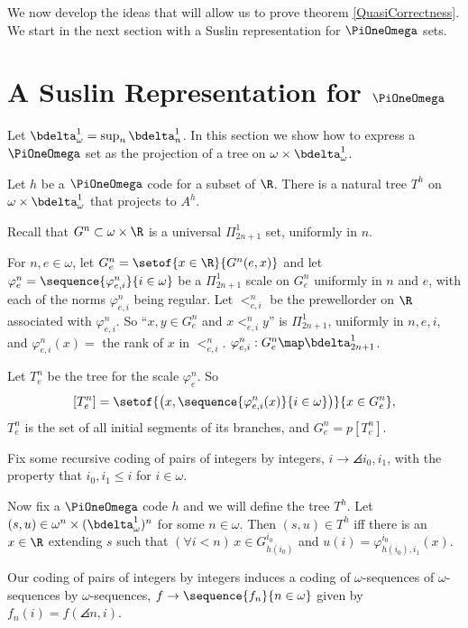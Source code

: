\documentclass[oneside,12pt]{amsart}
\begin{document}
We now develop the ideas that will allow us to prove theorem \ref{QuasiCorrectness}. We
start in the next section with a Suslin representation for $\PiOneOmega$ sets.

\section{A Suslin Representation for $\PiOneOmega$}
\label{section:suslinrep}

Let $\bdelta^1_{\omega} = \sup_n \bdelta^1_n$. In this section we show how to
express a $\PiOneOmega$ set as the projection
of a tree on $\omega\times \bdelta^1_{\omega}$.

\begin{definition}
Let $h$ be a $\PiOneOmega$ code for a subset of $\R$.
There is a natural tree $T^{h}$ on $\omega\times\bdelta^1_{\omega}$ that projects to $A^h$.

Recall that $G^n\subset\omega\times\R$ is a universal $\Pi^1_{2n+1}$ set, uniformly in $n$.

For $n,e\in\omega$, let $G^n_e = \setof{x\in\R}{G^n(e, x)}$ and
let $\varphi^n_e = \sequence{\varphi^n_{e,i}}{i\in\omega}$ be a $\Pi^1_{2n+1}$ scale on $G^n_e$ uniformly in $n$ and $e$,
with each of the norms $\varphi^n_{e,i}$ being regular.
Let $<^n_{e,i}$ be the prewellorder on $\R$ associated with $\varphi^n_{e,i}$. So ``$x,y\in G^n_e$ and $x <^n_{e,i} y$'' is
$\Pi^1_{2n+1}$, uniformly in $n,e,i$, and $\varphi^n_{e,i}(x) = $ the rank of $x$ in $<^n_{e,i}$.
$\varphi^n_{e,i} : G^n_e \map \bdelta^1_{2n+1}$.

Let $T^n_e$ be the tree for the scale $\varphi^n_e$. So
$$[T^n_e] = \setof{\left(x,\sequence{\varphi^n_{e,i}(x)}{i\in\omega}\right)}{x\in G^n_e},$$
$T^n_e$ is the set of all initial segments of its branches, and $G^n_e=p[T^n_e]$.

Fix some recursive coding of pairs of integers by integers, $i\to\angles{i_0,i_1}$,
with the property that $i_0,i_1\leq i$ for $i\in\omega$.

Now fix a $\PiOneOmega$ code $h$ and we will define the tree $T^h$.
Let $(s,u) \in \omega^n\times(\bdelta^1_{\omega})^n$ for some $n\in\omega$. Then $(s,u)\in T^h$ iff there is an
$x\in\R$ extending $s$ such that $(\forall i<n)\, x\in G^{i_0}_{h(i_0)}$ and
$u(i)=\varphi^{i_0}_{h(i_0),i_1}(x)$.
\end{definition}

Our coding of pairs of integers by integers induces a coding of $\omega$-sequences of $\omega$-sequences
by $\omega$-sequences, $f\to\sequence{f_n}{n\in\omega}$ given by $f_n(i) = f(\angles{n,i})$.
\end{document}
